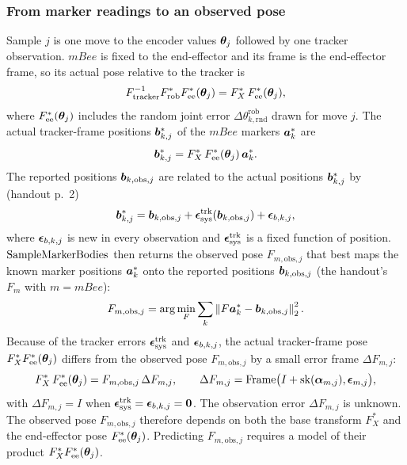 \documentclass[../main.tex]{subfiles}
\begin{document}
\subsubsection{From marker readings to an observed pose}
Sample $j$ is one move to the encoder values $\bm{\theta}_j$ followed by one tracker observation. $mBee$ is fixed to the end-effector and its frame is the end-effector frame, so its actual pose relative to the tracker is
\begin{equation}\label{eq:actual-mbee}
F_{\mathrm{tracker}}^{-1}F^*_{\mathrm{rob}}F^*_{\mathrm{ee}}(\bm{\theta}_j)=F^*_X\,F^*_{\mathrm{ee}}(\bm{\theta}_j),
\end{equation}
where $F^*_{\mathrm{ee}}(\bm{\theta}_j)$ includes the random joint error $\Delta\theta^{\mathrm{rob}}_{k,\mathrm{rnd}}$ drawn for move $j$. The actual tracker-frame positions $\bm{b}^*_{k,j}$ of the $mBee$ markers $\bm{a}^*_k$ are
\begin{equation}\label{eq:actual-markers}
\bm{b}^*_{k,j}=F^*_X\,F^*_{\mathrm{ee}}(\bm{\theta}_j)\,\bm{a}^*_k .
\end{equation}
The reported positions $\bm{b}_{k,\mathrm{obs},j}$ are related to the actual positions $\bm{b}^*_{k,j}$ by (handout p.~2)
\begin{equation}\label{eq:reported-markers}
\bm{b}^*_{k,j}=\bm{b}_{k,\mathrm{obs},j}+\bm{\epsilon}^{\mathrm{trk}}_{\mathrm{sys}}(\bm{b}_{k,\mathrm{obs},j})+\bm{\epsilon}_{b,k,j},
\end{equation}
where $\bm{\epsilon}_{b,k,j}$ is new in every observation and $\bm{\epsilon}^{\mathrm{trk}}_{\mathrm{sys}}$ is a fixed function of position. $\operatorname{SampleMarkerBodies}$ then returns the observed pose $F_{m,\mathrm{obs},j}$ that best maps the known marker positions $\bm{a}^*_k$ onto the reported positions $\bm{b}_{k,\mathrm{obs},j}$ (the handout's $F_m$ with $m=mBee$):
\begin{equation}\label{eq:observation}
F_{m,\mathrm{obs},j}=\arg\min_{F}\sum_k\left\|F\bm{a}^*_k-\bm{b}_{k,\mathrm{obs},j}\right\|_2^2 .
\end{equation}
Because of the tracker errors $\bm{\epsilon}^{\mathrm{trk}}_{\mathrm{sys}}$ and $\bm{\epsilon}_{b,k,j}$, the actual tracker-frame pose $F^*_X F^*_{\mathrm{ee}}(\bm{\theta}_j)$ differs from the observed pose $F_{m,\mathrm{obs},j}$ by a small error frame $\Delta F_{m,j}$:
\begin{equation}\label{eq:reading-error}
F^*_X\,F^*_{\mathrm{ee}}(\bm{\theta}_j)=F_{m,\mathrm{obs},j}\,\Delta F_{m,j},\qquad\Delta F_{m,j}=\operatorname{Frame}\bigl(I+\operatorname{sk}(\bm{\alpha}_{m,j}),\bm{\epsilon}_{m,j}\bigr),
\end{equation}
with $\Delta F_{m,j}=I$ when $\bm{\epsilon}^{\mathrm{trk}}_{\mathrm{sys}}=\bm{\epsilon}_{b,k,j}=\bm{0}$. The observation error $\Delta F_{m,j}$ is unknown. The observed pose $F_{m,\mathrm{obs},j}$ therefore depends on both the base transform $F^*_X$ and the end-effector pose $F^*_{\mathrm{ee}}(\bm{\theta}_j)$. Predicting $F_{m,\mathrm{obs},j}$ requires a model of their product $F^*_X F^*_{\mathrm{ee}}(\bm{\theta}_j)$.
\end{document}
